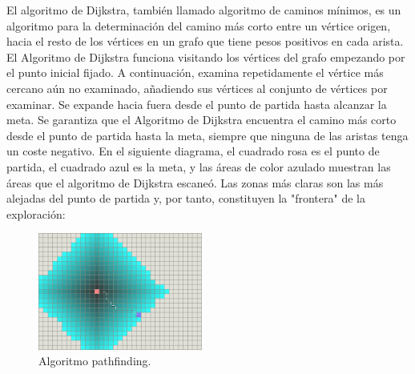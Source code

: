 \documentclass[reprint,amsmath,amssymb,aps]{revtex4-2}
\begin{document}

% 

El algoritmo de Dijkstra, también llamado algoritmo de caminos mínimos, es un algoritmo para la determinación del camino más corto entre un vértice origen, hacia el resto de los vértices en un grafo que tiene pesos positivos en cada arista. El Algoritmo de Dijkstra funciona visitando los vértices del grafo empezando por el punto inicial fijado. A continuación, examina repetidamente el vértice más cercano aún no examinado, añadiendo sus vértices al conjunto de vértices por examinar. Se expande hacia fuera desde el punto de partida hasta alcanzar la meta. Se garantiza que el Algoritmo de Dijkstra encuentra el camino más corto desde el punto de partida hasta la meta, siempre que ninguna de las aristas tenga un coste negativo. En el siguiente diagrama, el cuadrado rosa es el punto de partida, el cuadrado azul es la meta, y las áreas de color azulado muestran las áreas que el algoritmo de Dijkstra escaneó. Las zonas más claras son las más alejadas del punto de partida y, por tanto, constituyen la "frontera" de la exploración:

\begin{figure}[H]
 	\centering
 	\includegraphics[width=0.48\textwidth]{dijkstra.png}
 	\caption{Algoritmo pathfinding.}
 	\label{dijkstra}
\end{figure}
\end{document}
